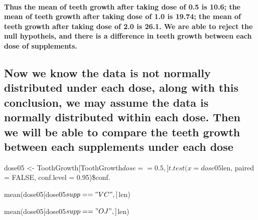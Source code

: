 \documentclass[
]{article}
\begin{document}
\hypertarget{thus-the-mean-of-teeth-growth-after-taking-dose-of-0.5-is-10.6-the-mean-of-teeth-growth-after-taking-dose-of-1.0-is-19.74-the-mean-of-teeth-growth-after-taking-dose-of-2.0-is-26.1.-we-are-able-to-reject-the-null-hypotheis-and-there-is-a-difference-in-teeth-growth-between-each-dose-of-supplements.}{%
\paragraph{Thus the mean of teeth growth after taking dose of 0.5 is
10.6; the mean of teeth growth after taking dose of 1.0 is 19.74; the
mean of teeth growth after taking dose of 2.0 is 26.1. We are able to
reject the null hypotheis, and there is a difference in teeth growth
between each dose of
supplements.}\label{thus-the-mean-of-teeth-growth-after-taking-dose-of-0.5-is-10.6-the-mean-of-teeth-growth-after-taking-dose-of-1.0-is-19.74-the-mean-of-teeth-growth-after-taking-dose-of-2.0-is-26.1.-we-are-able-to-reject-the-null-hypotheis-and-there-is-a-difference-in-teeth-growth-between-each-dose-of-supplements.}}

\hypertarget{now-we-know-the-data-is-not-normally-distributed-under-each-dose-along-with-this-conclusion-we-may-assume-the-data-is-normally-distributed-within-each-dose.-then-we-will-be-able-to-compare-the-teeth-growth-between-each-supplements-under-each-dose}{%
\subsection{Now we know the data is not normally distributed under each
dose, along with this conclusion, we may assume the data is normally
distributed within each dose. Then we will be able to compare the teeth
growth between each supplements under each
dose}\label{now-we-know-the-data-is-not-normally-distributed-under-each-dose-along-with-this-conclusion-we-may-assume-the-data-is-normally-distributed-within-each-dose.-then-we-will-be-able-to-compare-the-teeth-growth-between-each-supplements-under-each-dose}}

dose05 \textless-
ToothGrowth{[}ToothGrowth\(dose == 0.5, ] t.test(x = dose05\)len, paired
= FALSE, conf.level = 0.95)\$conf.

mean(dose05{[}dose05\(supp == "VC", ]\)len)

mean(dose05{[}dose05\(supp == "OJ", ]\)len)
\end{document}
